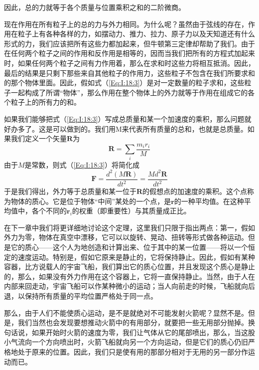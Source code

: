 因此，总的力就等于各个质量与位置乘积之和的二阶微商。

现在作用在所有粒子上的总的力与外力相同。为什么呢？虽然由于弦线的存在，作用在粒子上有各种各样的力，如摆动力、推力、拉力、原子力以及天知道还有什么形式的力，我们应该把所有这些力都加起来，但牛顿第三定律却帮助了我们。由于在任何两个粒子之间的作用和反作用是相等的，因而当我们把所有的方程式加起来时，如果任何两个粒子之间有力作用着，那么在求和时这些力将相互抵消。因此，最后的结果是只剩下那些来自其他粒子的作用力，这些粒子不包含在我们所要求和的那个物体里面。因此，假如式（\ref{Eq:I:18:3}）是对一定数量的粒子求和，这些粒子一起构成了所谓“物体”，那么作用在整个物体上的外力就等于作用在组成它的各个粒子上的所有力的和。

如果我们能够把式（\ref{Eq:I:18:3}）写成总质量和某一个加速度的乘积，那么问题就好办多了。这是可以做到的。我们用M来代表所有质量的总和，也就是总质量。如果我们定义一个矢量$\boldsymbol{R}$为
\begin{equation}
    \label{Eq:I:18:4}
    \boldsymbol{R}=\sum_i \frac{m_ir_i}{M}
\end{equation}
由于$M$是常数，则式（\ref{Eq:I:18:3}）将简化成
\begin{equation}
    \label{Eq:I:18:5}
    \boldsymbol{F}=\frac{d^2(M\boldsymbol{R})}{dt^2}=\frac{Md^2\boldsymbol{R}}{dt^2}
\end{equation}
于是我们得出，外力等于总质量和某一位于$\boldsymbol{R}$的假想点的加速度的乘积。这个点称为物体的质心。它是位于物体“中间”某处的一个点，是$\boldsymbol{r}$的一种平均值。在这种平均值中，各个不同的$\boldsymbol{r}_i$的权重（即重要性）与其质量成正比。

在下一章中我们将更详细地讨论这个定理，这里我们只限于指出两点：第一，假如外力为零，物体在真空中漂移，它可以以旋转、晃动、扭转等形式做各种运动。但是它的质心——这个人为地创造和计算出来、位于其中的某一位置——将以一个恒定的速度运动。特别是，假如它原来是静止的，它将保持静止。因此，假如有某种容器，比方说载人的宇宙飞船，我们算出它的质心位置，并且发现这个质心是静止的，那么，如果没有外力作用在这个容器上，它将一直保持静止。当然，由于人在内部来回走动，宇宙飞船可以作某种微小的运动；当人向前走的时候，飞船就向后退，以保持所有质量的平均位置严格处于同一点。

那么，由于人们不能使质心运动，是不是就绝对不可能发射火箭呢？显然不是。但是，我们当然也会发现要想推动火箭中的有用部分，就要把一些无用部分抛掉。换句话说，如果开始时火箭的速度为零，我们让气体从它的尾部喷出，那么，当这股小气流向一个方向喷出时，火箭飞船就向另一个方向运动，但是它们的质心仍旧严格地处于原来的位置。因此，我们只是使有用的那部分相对于无用的另一部分作运动而已。

